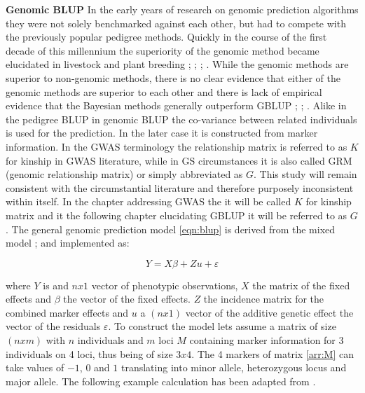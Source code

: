 \textbf{Genomic BLUP} \newline In the early years of research on genomic prediction algorithms they were not
solely benchmarked against each other, but had to compete with the previously popular pedigree
methods. Quickly in the course of the first decade of this millennium the superiority of the genomic method
became elucidated in livestock and plant breeding \cite{habier2007impact}; \cite{vanraden2008efficient};
\cite{vanraden2008reliability}; \cite{harris2009genomic}.  While the genomic methods are superior to
non-genomic methods, there is no clear evidence that either of the genomic methods are superior to each other
and there is lack of empirical evidence that the Bayesian methods generally outperform GBLUP
\cite{moser2009comparison} ; \cite{bernardo2010breeding}; \cite{azodi2019}.  Alike in the pedigree BLUP in
genomic BLUP the co-variance between related individuals is used for the prediction. In the later case it is
constructed from marker information. In the GWAS terminology the relationship matrix is referred to as $K$ for
kinship in GWAS literature, while in GS circumstances it is also called GRM (genomic relationship matrix) or
simply abbreviated as $G$. This study will remain consistent with the circumstantial literature and therefore
purposely inconsistent within itself. In the chapter addressing GWAS the it will be called $K$ for kinship
matrix and it the following chapter elucidating GBLUP it will be referred to as $G$.  The general genomic
prediction model \ref{eqn:blup} is derived from the mixed model \cite{henderson1975best};
\cite{vanraden2008efficient} and implemented as:

\begin{equation}
Y = X \beta  +  Zu + \varepsilon
  \label{eqn:blup}
\end{equation}

where $Y$ is and $nx1$ vector of phenotypic observations, $X$ the matrix of the fixed effects and $\beta$ the
vector of the fixed effects. $Z$ the incidence matrix for the combined marker effects and $u$ a $(nx1)$ vector
of the additive genetic effect the vector of the residuals $\varepsilon$.  To construct the model lets assume
a matrix of size $(n x m)$ with $n$ individuals and $m$ loci $M$ containing marker information for 3
individuals on 4 loci, thus being of size $3x4$. The 4 markers of matrix \ref{arr:M} can take values of $-1$,
$0$ and $1$ translating into minor allele, heterozygous locus and major allele. The following example
calculation has been adapted from \cite{isik2013}.

